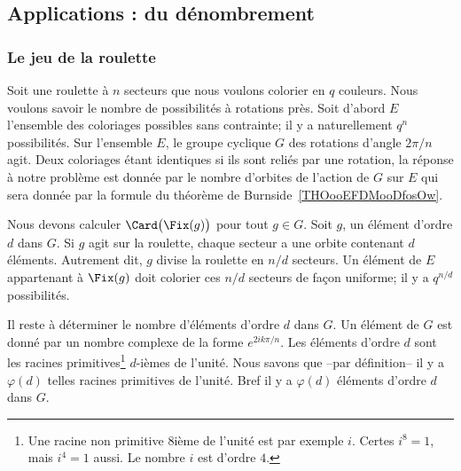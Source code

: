 \subsection{Applications : du dénombrement}

\subsubsection{Le jeu de la roulette}
\label{pTqJLY}

Soit une roulette à \( n\) secteurs que nous voulons colorier en \( q\) couleurs\cite{HEBOFl}. Nous voulons savoir le nombre de possibilités à rotations près. Soit d'abord \( E\) l'ensemble des coloriages possibles sans contrainte; il y a naturellement \( q^n\) possibilités. Sur l'ensemble \( E\), le groupe cyclique \( G\) des rotations d'angle \( 2\pi/n\) agit. Deux coloriages étant identiques si ils sont reliés par une rotation, la réponse à notre problème est donnée par le nombre d'orbites de l'action de \( G\) sur \( E\) qui sera donnée par la formule du théorème de Burnside~\ref{THOooEFDMooDfosOw}.

Nous devons calculer \( \Card\big( \Fix(g) \big)\) pour tout \( g\in G\). Soit \( g\), un élément d'ordre \( d\) dans \( G\). Si \( g\) agit sur la roulette, chaque secteur a une orbite contenant \( d\) éléments. Autrement dit, \( g\) divise la roulette en \( n/d\) secteurs. Un élément de \( E\) appartenant à \( \Fix(g)\) doit colorier ces \( n/d\) secteurs de façon uniforme; il y a \( q^{n/d}\) possibilités.

Il reste à déterminer le nombre d'éléments d'ordre \( d\) dans \( G\). Un élément de \( G\) est donné par un nombre complexe de la forme \(  e^{2ik\pi/n}\). Les éléments d'ordre \( d\) sont les racines primitives\footnote{Une racine non primitive \( 8\)ième de l'unité est par exemple \( i\). Certes \( i^8=1\), mais \( i^4=1\) aussi. Le nombre \( i\) est d'ordre \( 4\).} \( d\)-ièmes de l'unité. Nous savons que --par définition-- il y a \( \varphi(d)\) telles racines primitives de l'unité. Bref il y a \( \varphi(d)\) éléments d'ordre \( d\) dans \( G\).

